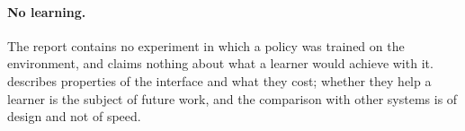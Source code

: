\paragraph{No learning.}
The report contains no experiment in which a policy was trained on the environment, and claims nothing about what a learner would achieve with it.
 describes properties of the interface and what they cost; whether they help a learner is the subject of future work, and the comparison with other systems is of design and not of speed.
